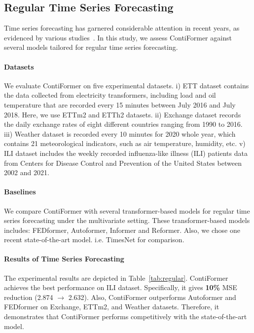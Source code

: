 \subsection{Regular Time Series Forecasting} \label{sec:regular}

Time series forecasting has garnered considerable attention in recent years, as evidenced by various studies~\cite{wu2021autoformer, zhou2021informer, li2023towards}. In this study, we assess ContiFormer against several models tailored for regular time series forecasting. 

\paragraph{Datasets}

We evaluate ContiFormer on five experimental datasets. i) ETT dataset \cite{zhou2021informer} contains the data collected from electricity transformers, including load and oil temperature that are recorded every 15 minutes between July 2016 and July 2018. Here, we use ETTm2 and ETTh2 datasets. ii) Exchange dataset \cite{wu2021autoformer} records the daily exchange rates of eight different countries ranging from 1990 to 2016. iii) Weather dataset is recorded every 10 minutes for 2020 whole year, which contains 21 meteorological indicators, such as air temperature, humidity, etc. v) ILI dataset includes the weekly recorded influenza-like illness (ILI) patients data from Centers for
Disease Control and Prevention of the United States between 2002 and 2021. 

\paragraph{Baselines}

We compare ContiFormer with several transformer-based models for regular time series forecasting under the multivariate setting. These transformer-based models includes: FEDformer\cite{zhou2022fedformer}, Autoformer\cite{wu2021autoformer}, Informer\cite{zhou2021informer} and Reformer\cite{kitaev2020reformer}. Also, we chose one recent state-of-the-art model. i.e. TimesNet\cite{wu2022timesnet} for comparison.

\paragraph{Results of Time Series Forecasting}

The experimental results are depicted in Table~\ref{tab:regular}. ContiFormer achieves the best performance on ILI dataset. Specifically, it gives \textbf{10\%} MSE reduction (2.874 $\rightarrow$ 2.632). Also, ContiFormer outperforms Autoformer and FEDformer on Exchange, ETTm2, and Weather datasets. Therefore, it demonstrates that ContiFormer performs competitively with the state-of-the-art model.

